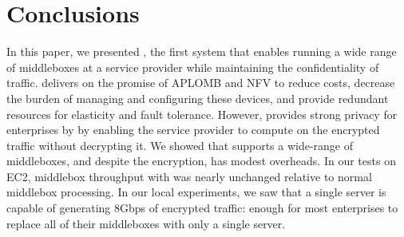
\section{Conclusions} \label{sec:concl}



In this paper, we presented \sys, the first system that enables running a wide range of middleboxes at a service provider 
while maintaining the confidentiality of traffic.
    \sys delivers on the promise of APLOMB and NFV to reduce costs, decrease the burden of managing and configuring these devices, and provide redundant resources for elasticity and fault tolerance.
    However, \sys provides strong privacy for enterprises by  by enabling the service provider to compute on the encrypted traffic without decrypting it. 
We showed that \sys supports a wide-range of middleboxes, and despite the encryption, \sys has modest overheads. In our tests on EC2, middlebox throughput with \sys was nearly unchanged relative to normal middlebox processing. In our local experiments, we saw that a single server is capable of generating 8Gbps of encrypted traffic: enough for most enterprises to replace all of their middleboxes with only a single server.
